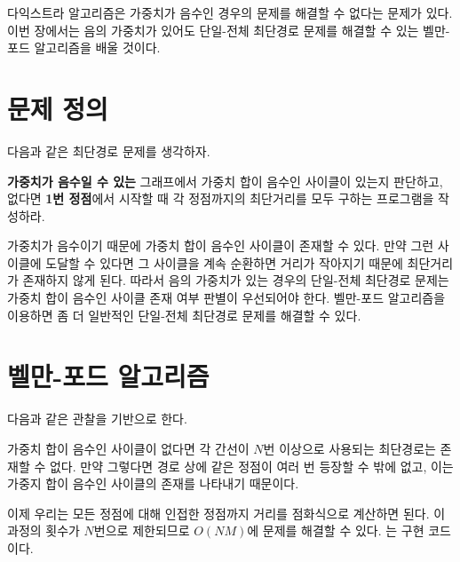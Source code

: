 다익스트라 알고리즘은 가중치가 음수인 경우의 문제를 해결할 수 없다는 문제가 있다. 이번 장에서는 음의 가중치가 있어도 단일-전체 최단경로 문제를 해결할 수 있는 벨만-포드 알고리즘을 배울 것이다.

\section{문제 정의}
다음과 같은 최단경로 문제를 생각하자.

\begin{example} \label{ex: Bellman-Ford}
    \textbf{가중치가 음수일 수 있는} 그래프에서 가중치 합이 음수인 사이클이 있는지 판단하고, 없다면 \textbf{1번 정점}에서 시작할 때 각 정점까지의 최단거리를 모두 구하는 프로그램을 작성하라.
\end{example}

가중치가 음수이기 때문에 가중치 합이 음수인 사이클이 존재할 수 있다. 만약 그런 사이클에 도달할 수 있다면 그 사이클을 계속 순환하면 거리가 작아지기 때문에 최단거리가 존재하지 않게 된다. 따라서 음의 가중치가 있는 경우의 단일-전체 최단경로 문제는 가중치 합이 음수인 사이클 존재 여부 판별이 우선되어야 한다.
벨만-포드 알고리즘을 이용하면 좀 더 일반적인 단일-전체 최단경로 문제를 해결할 수 있다.

\section{벨만-포드 알고리즘}
다음과 같은 관찰을 기반으로 한다.

\begin{obs}
    가중치 합이 음수인 사이클이 없다면 각 간선이 $N$번 이상으로 사용되는 최단경로는 존재할 수 없다. 만약 그렇다면 경로 상에 같은 정점이 여러 번 등장할 수 밖에 없고, 이는 가중지 합이 음수인 사이클의 존재를 나타내기 때문이다.
\end{obs}

이제 우리는 모든 정점에 대해 인접한 정점까지 거리를 점화식으로 계산하면 된다. 이 과정의 횟수가 $N$번으로 제한되므로 $O(NM)$에 문제를 해결할 수 있다. 는 구현 코드이다.

